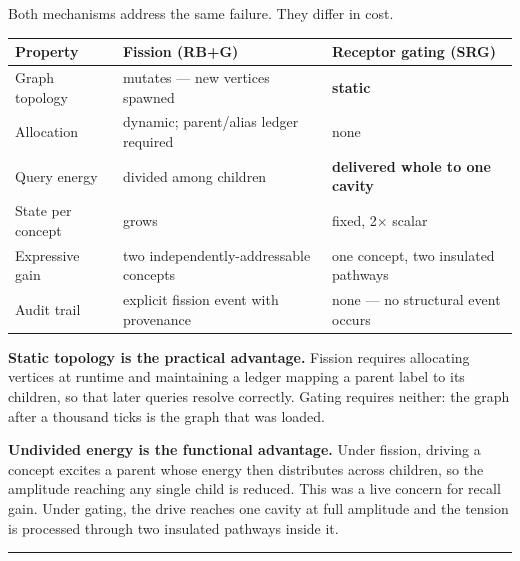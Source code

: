 \documentclass[
  11pt,
  a4paper,
]{article}
\begin{document}
Both mechanisms address the same failure. They differ in cost.

\begin{longtable}[]{@{}
  >{\raggedright\arraybackslash}p{}
  >{\raggedright\arraybackslash}p{}
  >{\raggedright\arraybackslash}p{}@{}}
\toprule\noalign{}
\begin{minipage}[b]{\linewidth}\raggedright
Property
\end{minipage} & \begin{minipage}[b]{\linewidth}\raggedright
Fission (RB+G)
\end{minipage} & \begin{minipage}[b]{\linewidth}\raggedright
Receptor gating (SRG)
\end{minipage} \\
\midrule\noalign{}
\endhead
\bottomrule\noalign{}
\endlastfoot
Graph topology & mutates --- new vertices spawned & \textbf{static} \\
Allocation & dynamic; parent/alias ledger required & none \\
Query energy & divided among children & \textbf{delivered whole to one
cavity} \\
State per concept & grows & fixed, 2× scalar \\
Expressive gain & two independently-addressable concepts & one concept,
two insulated pathways \\
Audit trail & explicit fission event with provenance & none --- no
structural event occurs \\
\end{longtable}

\textbf{Static topology is the practical advantage.} Fission requires
allocating vertices at runtime and maintaining a ledger mapping a parent
label to its children, so that later queries resolve correctly. Gating
requires neither: the graph after a thousand ticks is the graph that was
loaded.

\textbf{Undivided energy is the functional advantage.} Under fission,
driving a concept excites a parent whose energy then distributes across
children, so the amplitude reaching any single child is reduced. This
was a live concern for recall gain. Under gating, the drive reaches one
cavity at full amplitude and the tension is processed through two
insulated pathways inside it.

\begin{center}\rule{0.5\linewidth}{0.5pt}\end{center}
\end{document}
